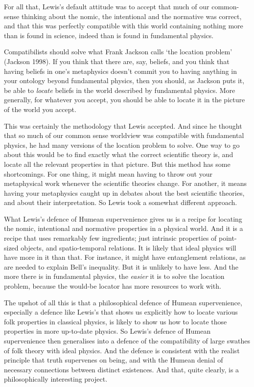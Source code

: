 For all that, Lewis's default attitude was to accept that much of our common-sense thinking about the nomic, the intentional and the normative was correct, and that this was perfectly compatible with this world containing nothing more than is found in science, indeed than is found in fundamental physics.

Compatibilists should solve what Frank Jackson calls `the location problem' (Jackson 1998). If you think that there are, say, beliefs, and you think that having beliefs in one's metaphysics doesn't commit you to having anything in your ontology beyond fundamental physics, then you should, as Jackson puts it, be able to \textit{locate} beliefs in the world described by fundamental physics. More generally, for whatever you accept, you should be able to locate it in the picture of the world you accept.

This was certainly the methodology that Lewis accepted. And since he thought that so much of our common sense worldview was compatible with fundamental physics, he had many versions of the location problem to solve. One way to go about this would be to find exactly what the correct scientific theory is, and locate all the relevant properties in that picture. But this method has some shortcomings. For one thing, it might mean having to throw out your metaphysical work whenever the scientific theories change. For another, it means having your metaphysics caught up in debates about the best scientific theories, and about their interpretation. So Lewis took a somewhat different approach.

What Lewis's defence of Humean supervenience gives us is a recipe for locating the nomic, intentional and normative properties in a physical world. And it is a recipe that uses remarkably few ingredients; just intrinsic properties of point-sized objects, and spatio-temporal relations. It is likely that ideal physics will have more in it than that. For instance, it might have entanglement relations, as are needed to explain Bell's inequality. But it is unlikely to have less. And the more there is in fundamental physics, the \textit{easier} it is to solve the location problem, because the would-be locator has more resources to work with.

The upshot of all this is that a philosophical defence of Humean supervenience, especially a defence like Lewis's that shows us explicitly how to locate various folk properties in classical physics, is likely to show us how to locate those properties in more up-to-date physics. So Lewis's defence of Humean supervenience then generalises into a defence of the compatibility of large swathes of folk theory with ideal physics. And the defence is consistent with the realist principle that truth supervenes on being, and with the Humean denial of necessary connections between distinct existences. And that, quite clearly, is a philosophically interesting project.

